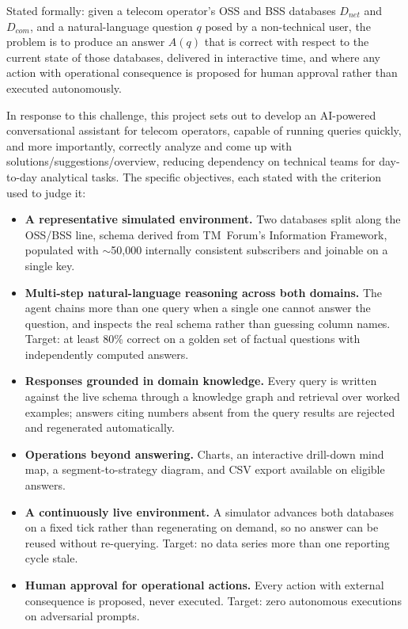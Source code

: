Stated formally: given a telecom operator's OSS and BSS databases $D_{net}$ and $D_{com}$, and a natural-language question $q$ posed by a non-technical user, the problem is to produce an answer $A(q)$ that is correct with respect to the current state of those databases, delivered in interactive time, and where any action with operational consequence is proposed for human approval rather than executed autonomously.

In response to this challenge, this project sets out to develop an AI-powered conversational assistant for telecom operators, capable of running queries quickly, and more importantly, correctly analyze and come up with solutions/suggestions/overview, reducing dependency on technical teams for day-to-day analytical tasks.
The specific objectives, each stated with the criterion used to judge it:
\begin{itemize}
    \item \textbf{A representative simulated environment.} Two databases split along
    the OSS/BSS line, schema derived from TM~Forum's Information Framework, populated
    with $\sim$50{,}000 internally consistent subscribers and joinable on a single key.
    \item \textbf{Multi-step natural-language reasoning across both domains.} The agent
    chains more than one query when a single one cannot answer the question, and
    inspects the real schema rather than guessing column names. Target: at least 80\%
    correct on a golden set of factual questions with independently computed answers.
    \item \textbf{Responses grounded in domain knowledge.} Every query is written
    against the live schema through a knowledge graph and retrieval over worked
    examples; answers citing numbers absent from the query results are rejected and
    regenerated automatically.
    \item \textbf{Operations beyond answering.} Charts, an interactive drill-down mind
    map, a segment-to-strategy diagram, and CSV export available on eligible answers.
    \item \textbf{A continuously live environment.} A simulator advances both databases
    on a fixed tick rather than regenerating on demand, so no answer can be reused
    without re-querying. Target: no data series more than one reporting cycle stale.
    \item \textbf{Human approval for operational actions.} Every action with external
    consequence is proposed, never executed. Target: zero autonomous executions on
    adversarial prompts.
\end{itemize}

